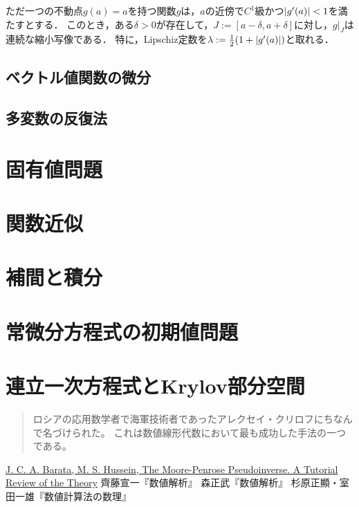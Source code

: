 \documentclass[uplatex, dvipdfmx]{jsreport}
\begin{document}
\begin{proposition}
    ただ一つの不動点$g(a)=a$を持つ関数$g$は，$a$の近傍で$C^1$級かつ$\lvert g'(a)\rvert<1$を満たすとする．
    このとき，ある$\delta>0$が存在して，$J:=[a-\delta,a+\delta]$に対し，$g|_J$は連続な縮小写像である．
    特に，Lipschiz定数を$\lambda:=\frac{1}{2}(1+\lvert g'(a)\rvert)$と取れる．
\end{proposition}

\section{ベクトル値関数の微分}

\section{多変数の反復法}

\chapter{固有値問題}

\chapter{関数近似}

\chapter{補間と積分}

\chapter{常微分方程式の初期値問題}

\chapter{連立一次方程式とKrylov部分空間}

\begin{quotation}
    ロシアの応用数学者で海軍技術者であったアレクセイ・クリロフにちなんで名づけられた。
    これは数値線形代数において最も成功した手法の一つである。 
\end{quotation}

\begin{thebibliography}{9}
    \href{https://arxiv.org/abs/1110.6882v1}{J. C. A. Barata, M. S. Hussein, The Moore-Penrose Pseudoinverse. A Tutorial Review of the Theory}
    齊藤宣一『数値解析』
    森正武『数値解析』
    杉原正顯・室田一雄『数値計算法の数理』
\end{thebibliography}
\end{document}
